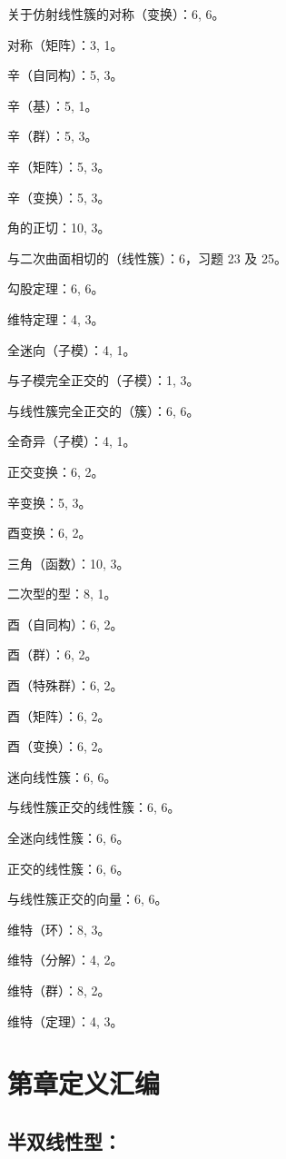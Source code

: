 关于仿射线性簇的对称（变换）：6, 6。

对称（矩阵）：3, 1。

辛（自同构）：5, 3。

辛（基）：5, 1。

辛（群）：5, 3。

辛（矩阵）：5, 3。

辛（变换）：5, 3。

角的正切：10, 3。

与二次曲面相切的（线性簇）：6，习题 23 及 25。

勾股定理：6, 6。

维特定理：4, 3。

全迷向（子模）：4, 1。

与子模完全正交的（子模）：1, 3。

与线性簇完全正交的（簇）：6, 6。

全奇异（子模）：4, 1。

正交变换：6, 2。

辛变换：5, 3。

酉变换：6, 2。

三角（函数）：10, 3。

二次型的型：8, 1。

酉（自同构）：6, 2。

酉（群）：6, 2。

酉（特殊群）：6, 2。

酉（矩阵）：6, 2。

酉（变换）：6, 2。

迷向线性簇：6, 6。

与线性簇正交的线性簇：6, 6。

全迷向线性簇：6, 6。

正交的线性簇：6, 6。

与线性簇正交的向量：6, 6。

维特（环）：8, 3。

维特（分解）：4, 2。

维特（群）：8, 2。

维特（定理）：4, 3。

\chapter*{\texorpdfstring{第章定义汇编}{第九章定义汇编}}
{}

\section*{半双线性型：}

